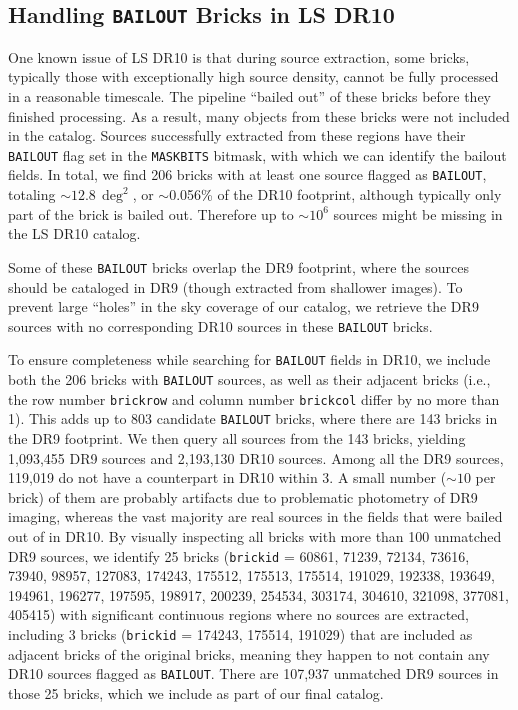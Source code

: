 \documentclass[twocolumn]{aastex631}
\newcommand{\dr}[1]{DR{#1}}
\begin{document}
\begin{CJK*}{UTF8}{gbsn}
\appendix

\section{Handling \texttt{BAILOUT} Bricks in LS \dr{10}}\label{sec:bailout}
One known issue of LS \dr{10} is that during source extraction, some bricks, typically those with exceptionally high source density, cannot be fully processed in a reasonable timescale. The pipeline ``bailed out'' of these bricks before they finished processing. As a result, many objects from these bricks were not included in the catalog. Sources successfully extracted from these regions have their \texttt{BAILOUT} flag set in the \texttt{MASKBITS} bitmask, with which we can identify the bailout fields. In total, we find 206 bricks with at least one source flagged as \texttt{BAILOUT}, totaling $\sim$$12.8\,\deg^2$, or $\sim$0.056\% of the \dr{10} footprint, although typically only part of the brick is bailed out. Therefore up to $\sim$$10^6$ sources might be missing in the LS \dr{10} catalog.

Some of these \texttt{BAILOUT} bricks overlap the \dr{9} footprint, where the sources should be cataloged in \dr{9} (though extracted from shallower images). To prevent large ``holes'' in the sky coverage of our catalog, we retrieve the \dr{9} sources with no corresponding \dr{10} sources in these \texttt{BAILOUT} bricks. 

To ensure completeness while searching for \texttt{BAILOUT} fields in \dr{10}, we include both the 206 bricks with \texttt{BAILOUT} sources, as well as their adjacent bricks (i.e., the row number \texttt{brickrow} and column number \texttt{brickcol} differ by no more than 1). This adds up to 803 candidate \texttt{BAILOUT} bricks, where there are 143 bricks in the \dr{9} footprint. We then query all sources from the 143 bricks, yielding 1,093,455 \dr{9} sources and 2,193,130 \dr{10} sources. Among all the \dr{9} sources, 119,019 do not have a counterpart in \dr{10} within 3. A small number ($\sim$$10$ per brick) of them are probably artifacts due to problematic photometry of \dr{9} imaging, whereas the vast majority are real sources in the fields that were bailed out of in \dr{10}. By visually inspecting all bricks with more than 100 unmatched \dr{9} sources, we identify 25 bricks (\texttt{brickid} = 60861,  71239,  72134,  73616,  73940,  98957, 127083, 174243, 175512, 175513, 175514, 191029, 192338, 193649, 194961, 196277, 197595, 198917, 200239, 254534, 303174, 304610, 321098, 377081,
405415) with significant continuous regions where no sources are extracted, including 3 bricks (\texttt{brickid} = 174243, 175514, 191029) that are included as adjacent bricks of the original bricks, meaning they happen to not contain any \dr{10} sources flagged as \texttt{BAILOUT}. There are 107,937 unmatched \dr{9} sources in those 25 bricks, which we include as part of our final catalog. %


\end{CJK*}
\end{document}
